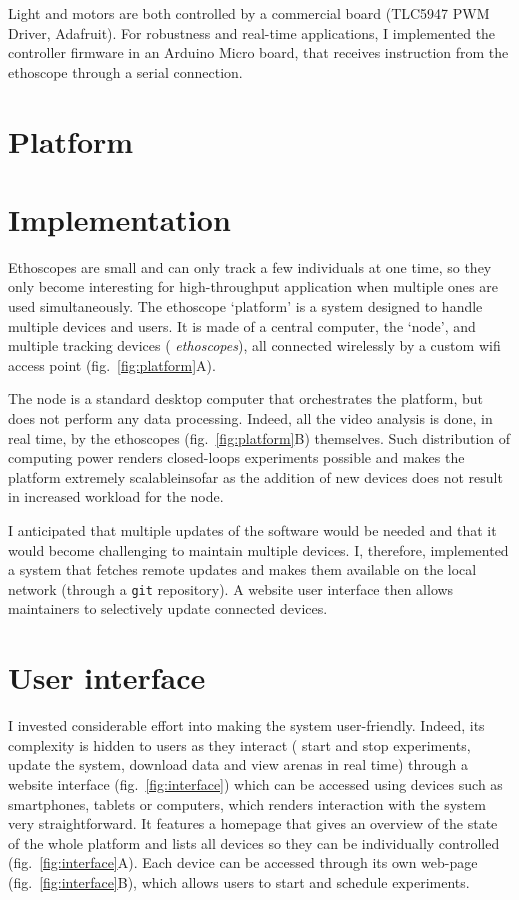 Light and motors are both controlled by a commercial board (TLC5947 PWM Driver, Adafruit).
For robustness and real-time applications, 
I implemented the controller firmware in an Arduino Micro board, that receives instruction from the ethoscope through a serial connection.


\section{Platform}

\section{Implementation}
Ethoscopes are small and can only track a few individuals at one time, so they only become interesting for high-throughput application when multiple ones are used simultaneously.
The ethoscope `platform' is a system designed to handle multiple devices and users.
It is made of a central computer, the `node', and multiple tracking devices (\ie{} \emph{ethoscopes}), all connected wirelessly by a custom wifi access point (fig.~\ref{fig:platform}A). 




The node is a  standard desktop computer that orchestrates the platform, but does not perform any data processing.
Indeed, all the video analysis is done, in real time, by the ethoscopes (fig.~\ref{fig:platform}B) themselves. 
Such distribution of computing power renders closed-loops experiments possible and makes the platform extremely scalable\emd{}insofar as the addition of new devices does not result in increased workload for the node.

I anticipated that multiple updates of the software would be needed and that it would become challenging to maintain multiple devices. 
I, therefore, implemented a system that fetches remote updates and makes them available on the local network (through a \texttt{git} repository). 
A website user interface then allows maintainers to selectively update connected devices.


\section{User interface}


I invested considerable effort into making the system user-friendly.
Indeed, its complexity is hidden to users as they interact (\ie{} start and stop experiments, update the system, download data and view arenas in real time) through a website interface (fig.~\ref{fig:interface}) which can be accessed using devices such as smartphones, tablets or computers, which renders interaction with the system very straightforward.
It features a homepage that gives an overview of the state of the whole platform and lists all devices so they can be individually controlled (fig.~\ref{fig:interface}A).
Each device can be accessed through its own web-page (fig.~\ref{fig:interface}B), which allows users to start and schedule experiments.

